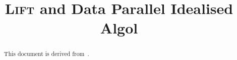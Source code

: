 \documentclass[
  nonacm,
  format=acmsmall,
  screen=true,
  timestamp=true
]{acmart}
\newcommand{\Lift}{\textsc{Lift}\xspace}
\newcommand{\papertitle}{\Lift and Data Parallel Idealised Algol}
\begin{document}
\title{\papertitle}





\authorsaddresses{}

\begin{abstract}
    This document is derived from~\cite{DBLP:journals/corr/abs-1710-08332}.
\end{abstract}
\end{document}
